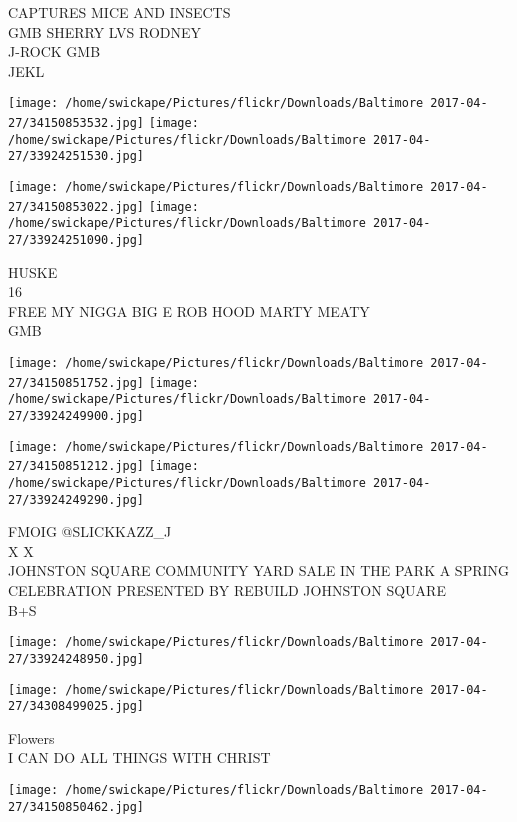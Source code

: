 \documentclass[10pt,letterpaper]{article}
\begin{document}
CAPTURES MICE AND INSECTS\\
GMB SHERRY LVS RODNEY\\
J{-}ROCK GMB\\
JEKL\\
\pagebreak

\texttt{[image: /home/swickape/Pictures/flickr/Downloads/Baltimore 2017-04-27/34150853532.jpg]}
\texttt{[image: /home/swickape/Pictures/flickr/Downloads/Baltimore 2017-04-27/33924251530.jpg]}

\texttt{[image: /home/swickape/Pictures/flickr/Downloads/Baltimore 2017-04-27/34150853022.jpg]}
\texttt{[image: /home/swickape/Pictures/flickr/Downloads/Baltimore 2017-04-27/33924251090.jpg]}

HUSKE\\
16\\
FREE MY NIGGA BIG E ROB HOOD MARTY MEATY\\
GMB\\
\pagebreak

\texttt{[image: /home/swickape/Pictures/flickr/Downloads/Baltimore 2017-04-27/34150851752.jpg]}
\texttt{[image: /home/swickape/Pictures/flickr/Downloads/Baltimore 2017-04-27/33924249900.jpg]}

\texttt{[image: /home/swickape/Pictures/flickr/Downloads/Baltimore 2017-04-27/34150851212.jpg]}
\texttt{[image: /home/swickape/Pictures/flickr/Downloads/Baltimore 2017-04-27/33924249290.jpg]}

FMOIG @SLICKKAZZ\_J\\
X X\\
JOHNSTON SQUARE COMMUNITY YARD SALE IN THE PARK A SPRING CELEBRATION PRESENTED BY REBUILD JOHNSTON SQUARE\\
B+S\\
\pagebreak

\texttt{[image: /home/swickape/Pictures/flickr/Downloads/Baltimore 2017-04-27/33924248950.jpg]}

\vspace{0.25in}
\texttt{[image: /home/swickape/Pictures/flickr/Downloads/Baltimore 2017-04-27/34308499025.jpg]}

Flowers\\
I CAN DO ALL THINGS WITH CHRIST\\
\pagebreak

\texttt{[image: /home/swickape/Pictures/flickr/Downloads/Baltimore 2017-04-27/34150850462.jpg]}
\end{document}
